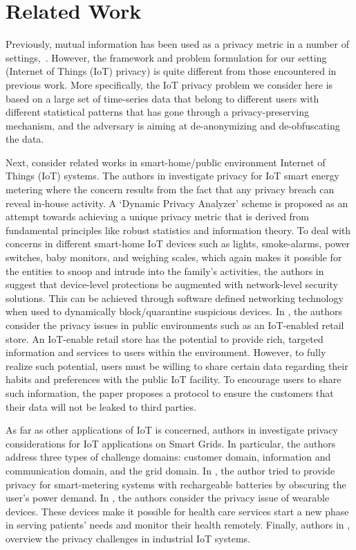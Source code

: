 \section{Related Work}
\label{relatedwork}

Previously, mutual information has been used as a privacy metric in a number of settings,~\cite{salamatian2013hide, csiszar1996almost, calmon2015fundamental, sankar2013utility, sankarISIT,sankar, yamamoto1983source, hyposankar}. However, the framework and problem formulation for our setting (Internet of Things (IoT) privacy) is quite different from those encountered in previous work. More specifically, the IoT privacy problem we consider here is based on a large set of time-series data that belong to different users with different statistical patterns that has gone through a privacy-preserving mechanism, and the adversary is aiming at de-anonymizing and de-obfuscating the data.


Next, consider related works in smart-home/public environment Internet of Things (IoT) systems. The authors in \cite{8ukil2015privacy} investigate privacy for IoT smart energy metering where the concern results from the fact that any privacy breach can reveal in-house activity. A `Dynamic Privacy Analyzer' scheme is proposed as an attempt towards achieving a unique privacy metric that is derived from fundamental principles like robust statistics and information theory.
To deal with concerns in different smart-home IoT devices such as lights, smoke-alarms, power switches, baby monitors, and weighing scales, which again makes it possible for the entities to snoop and intrude into the family's activities, the authors in \cite{12sivaraman2015network} suggest that device-level protections be augmented with network-level security solutions. This can be achieved through software defined networking technology when used to dynamically block/quarantine suspicious devices. In \cite{10harris2016security}, the authors consider the privacy issues in public environments such as an IoT-enabled retail store. An IoT-enable retail store has the potential to provide rich, targeted information and services to users within the environment. However, to fully realize such potential, users must be willing to share certain data regarding their habits and preferences with the public IoT facility. To encourage users to share such information, the paper proposes a protocol to ensure the customers that their data will not be leaked to third parties.

As far as other applications of IoT is concerned, authors in \cite{9dalipi2016security} investigate privacy considerations for IoT applications on Smart Grids. In particular, the authors address three types of challenge domains: customer domain, information and communication domain, and the grid domain. In \cite{battery15}, the author tried to provide privacy for smart-metering systems with rechargeable batteries by obscuring the user's power demand.
In \cite{11al2015security}, the authors consider the privacy issue of wearable devices. These devices make it possible for health care services start a new phase in serving patients' needs and monitor their health remotely. Finally, authors in \cite{14sadeghi2015security}, overview the privacy challenges in  industrial IoT systems.


